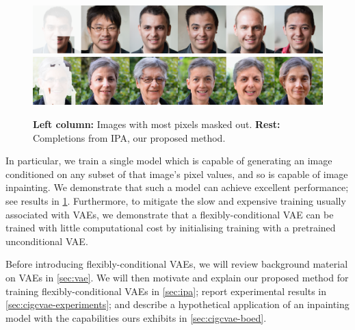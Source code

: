 \begin{figure}[t]
  \centering
  \includegraphics[width=\textwidth]{figs/cigcvae/qual/0_0_patches-4.png}
  \includegraphics[width=\textwidth]{figs/cigcvae/qual/59_2_3_modddd.png}
  \caption{\textbf{Left column:} Images with most pixels masked out.
    \textbf{Rest:} Completions from IPA, our proposed method.
  }
  \label{fig:cigcvae-headline}
\end{figure}

In particular, we train a single model which is capable of generating an image conditioned on any subset of that image's pixel values, and so is capable of image inpainting. We demonstrate that such a model can achieve excellent performance; see results in \cref{fig:cigcvae-headline}. Furthermore, to mitigate the slow and expensive training usually associated with VAEs, we demonstrate that a flexibly-conditional VAE can be trained with little computational cost by initialising training with a pretrained unconditional VAE. 



Before introducing flexibly-conditional VAEs, we will review background material on VAEs in \cref{sec:vae}. We will then motivate and explain our proposed method for training flexibly-conditional VAEs in \cref{sec:ipa}; report experimental results in \cref{sec:cigcvae-experiments}; and describe a hypothetical application of an inpainting model with the capabilities ours exhibits in \cref{sec:cigcvae-boed}.


